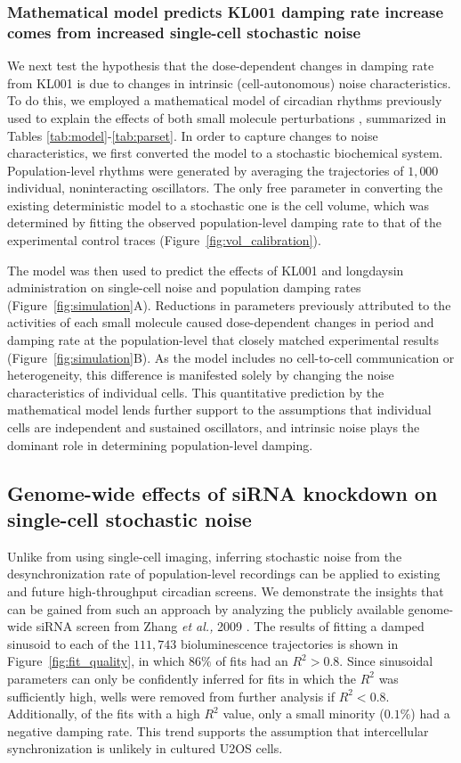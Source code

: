 \documentclass[11pt, letterpaper]{article}
\begin{document}
\subsubsection*{Mathematical model predicts KL001 damping rate increase comes from increased single-cell stochastic noise}

We next test the hypothesis that the dose-dependent changes in damping rate from KL001 is due to changes in intrinsic (cell-autonomous) noise characteristics.
To do this, we employed a mathematical model of circadian rhythms previously used to explain the effects of both small molecule perturbations \cite{St.John2014}, summarized in Tables \ref{tab:model}-\ref{tab:parset}.
In order to capture changes to noise characteristics, we first converted the model to a stochastic biochemical system.
Population-level rhythms were generated by averaging the trajectories of $1,000$ individual, noninteracting oscillators.
The only free parameter in converting the existing deterministic model to a stochastic one is the cell volume, which was determined by fitting the observed population-level damping rate to that of the experimental control traces (Figure~\ref{fig:vol_calibration}).

The model was then used to predict the effects of KL001 and longdaysin administration on single-cell noise and population damping rates (Figure~\ref{fig:simulation}A).
Reductions in parameters previously attributed to the activities of each small molecule caused dose-dependent changes in period and damping rate at the population-level that closely matched experimental results (Figure~\ref{fig:simulation}B).
As the model includes no cell-to-cell communication or heterogeneity, this difference is manifested solely by changing the noise characteristics of individual cells.
This quantitative prediction by the mathematical model lends further support to the assumptions that individual cells are independent and sustained oscillators, and intrinsic noise plays the dominant role in determining population-level damping.

\subsection*{Genome-wide effects of siRNA knockdown on single-cell stochastic noise}

Unlike from using single-cell imaging, inferring stochastic noise from the desynchronization rate of population-level recordings can be applied to existing and future high-throughput circadian screens.
We demonstrate the insights that can be gained from such an approach by analyzing the publicly available genome-wide siRNA screen from Zhang {\itshape et al.,} 2009 \cite{Zhang2009}.
The results of fitting a damped sinusoid to each of the $111,743$ bioluminescence trajectories is shown in Figure~\ref{fig:fit_quality}, in which $86\%$ of fits had an $R^2 > 0.8$.
Since sinusoidal parameters can only be confidently inferred for fits in which the $R^2$ was sufficiently high, wells were removed from further analysis if $R^2 < 0.8$.
Additionally, of the fits with a high $R^2$ value, only a small minority ($0.1\%$) had a negative damping rate.
This trend supports the assumption that intercellular synchronization is unlikely in cultured U2OS cells. 
\end{document}
